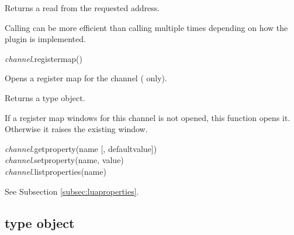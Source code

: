 \documentclass[a4paper,12pt,twoside,extrafontsizes]{memoir}
\begin{document}
\begin{funcret}
	Returns a  read from the requested address.
\end{funcret}

\begin{funcremarks}
	Calling  can be more efficient than calling  multiple times depending on how the plugin is implemented.
\end{funcremarks}


\begin{luafuncprototype}
\emph{channel}.registermap()
\end{luafuncprototype}

\begin{funcdescr}
	Opens a register map for the channel ( only).
\end{funcdescr}

\begin{funcret}
	Returns a  type object.
\end{funcret}

\begin{funcremarks}
	If a register map windows for this channel is not opened, this function opens it. Otherwise it raises the existing window.
\end{funcremarks}


\begin{luafuncprototype}
\emph{channel}.getproperty(name [, defaultvalue])\\
\emph{channel}.setproperty(name, value)\\
\emph{channel}.listproperties(name)
\end{luafuncprototype}

\begin{funcdescr}
	See Subsection \ref{subsec:luaproperties}.
\end{funcdescr}

\subsection{ type object}

\end{document}
